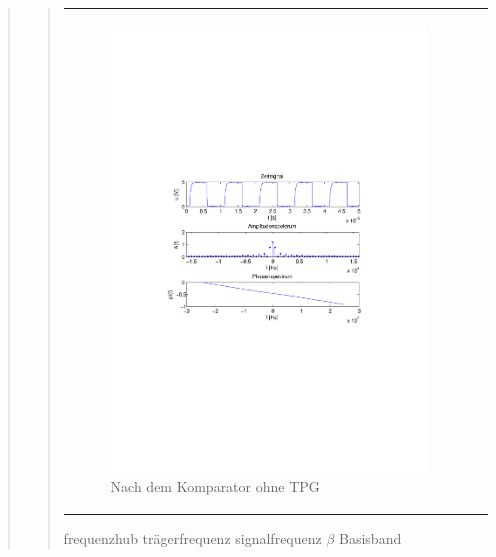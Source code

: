 \begin{quote}
\begin{quote}
\begin{center}
\begin{tabular}{ll}
                \begin{minipage}{0.67\textwidth}
                    \begin{figure}[H]
                        \label{fig:nach Filter}
                        \includegraphics[scale=0.7, trim = 35mm 100mm 35mm 95mm, clip]{Bilder/f1comp}
                        \caption{Nach dem Komparator ohne TPG}
                    \end{figure}
                \end{minipage}
            
            \end{tabular}
            \end{center}
        
        
        
        
        frequenzhub
        trägerfrequenz
        signalfrequenz
        $\beta$
        Basisband
        

\end{quote}
\end{quote}
